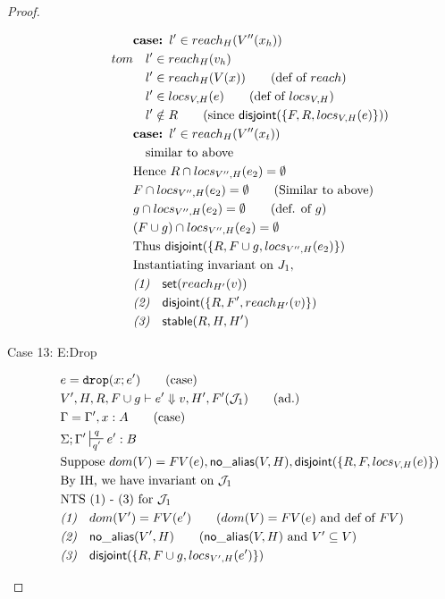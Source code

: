 \documentclass[11pt]{article}
\newcommand{\ms}[1]{\ensuremath{\mathsf{#1}}}
\newcommand{\irl}[1]{\mathtt{#1}}
\newcommand{\na}[1]{\mathsf{no\_alias}(#1)}
\newcommand{\stable}[1]{\mathsf{stable}(#1)}
\newcommand{\dist}[1]{\mathsf{disjoint}(#1)}
\theoremstyle{definition}
\begin{document}
\begin{proof}
\begin{description}
\begin{align*}
  &\textbf{case: }  l' \in reach_{H}(V''(x_h)) \\tom
  &\quad l' \in reach_{H}(v_h)\\
  &\quad l' \in reach_{H}(V(x)) \tag{def of $reach$}\\
  &\quad l' \in locs_{V,H}(e) \tag{def of $locs_{V,H}$}\\
  &\quad l' \notin R \tag{since $\dist{\{F,R,locs_{V,H}(e)\}}$}\\
  &\textbf{case: }  l' \in reach_{H}(V''(x_t)) \\
  &\quad \text{similar to above}\\
  &\text{Hence } R \cap locs_{V'',H}(e_2) = \emptyset\\
  &F \cap locs_{V'',H}(e_2) = \emptyset \tag{Similar to above}\\
  &g \cap locs_{V'',H}(e_2) = \emptyset \tag{def. of $g$}\\
  &(F \cup g) \cap locs_{V'',H}(e_2) = \emptyset\\
  &\text{Thus } \dist{\{R,F \cup g,locs_{V'',H}(e_2)\}}\\
  &\text{Instantiating invariant on } J_1,\\
  &\emph{(1)} \quad \ms{set}(reach_{H'}(v))\\
  &\emph{(2)} \quad\dist{\{R,F',reach_{H'}(v)\}}\\
  &\emph{(3)} \quad\stable{R,H,H'}\\
  \end{align*}
  \item [Case 13: E:Drop]
  \begin{align*}
  &e = \irl{drop}(x;e') \tag{case}\\
  &V',H,R,F \cup g \vdash e' \Downarrow v,H',F' (\mathcal{J}_1) \tag{ad.}\\
  &\Gamma = \Gamma',x:A \tag{case}\\
  &\Sigma;\Gamma' \sststile{q'}{q} e' : B\\
  &\text{Suppose } dom(V) = FV(e), \na{V,H},\dist{\{R,F,locs_{V,H}(e)\}}\\
  &\text{By IH, we have invariant on } \mathcal{J}_1\\
  &\text{NTS (1) - (3) for } \mathcal{J}_1\\
  &\emph{(1)} \quad dom(V') = FV(e') \tag{$dom(V) = FV(e)$ and def of $FV$}\\
  &\emph{(2)} \quad \na{V',H} \tag{$\na{V,H}$ and $V' \subseteq V$}\\
  &\emph{(3)} \quad \dist{\{R,F \cup g,locs_{V',H}(e')\}}\\

\end{align*}
\end{description}
\end{proof}
\end{document}
